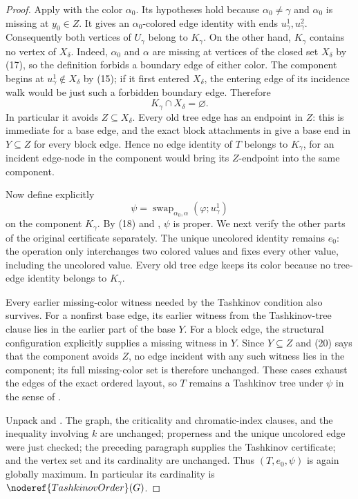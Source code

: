 \begin{proof}
Apply  with the color $\alpha_0$.
Its hypotheses hold because $\alpha_0\ne\gamma$ and $\alpha_0$ is missing
at $y_0\in Z$.  It gives an $\alpha_0$-colored edge identity with ends
$u^1_\gamma,u^2_\gamma$.  Consequently both vertices of $U_\gamma$
belong to $K_\gamma$.  On the other hand, $K_\gamma$ contains no vertex
of $X_\delta$.  Indeed, $\alpha_0$ and $\alpha$ are missing at vertices
of the closed set $X_\delta$ by (17), so the definition
 forbids a boundary edge of either color.
The component begins at $u^1_\gamma\notin X_\delta$ by (15); if it first
entered $X_\delta$, the entering edge of its incidence walk would be just
such a forbidden boundary edge.  Therefore
\[
 K_\gamma\cap X_\delta=\varnothing.                           \tag{20}
\]
In particular it avoids $Z\subseteq X_\delta$.  Every old tree edge has
an endpoint in $Z$: this is immediate for a base edge, and the exact block
attachments in  give a base end
in $Y\subseteq Z$ for every block edge.  Hence no edge identity of $T$
belongs to $K_\gamma$, for an incident edge-node in the component would
bring its $Z$-endpoint into the same component.

Now define explicitly
\[
 \psi=\operatorname{swap}_{\alpha_0,\alpha}
       (\varphi;u^1_\gamma)
\]
on the component $K_\gamma$.  By (18) and
, $\psi$ is proper.  We next verify
the other parts of the original certificate separately.  The unique
uncolored identity remains $e_0$: the operation
 only interchanges two colored values and
fixes every other value, including the uncolored value.  Every old tree
edge keeps its color because no tree-edge identity belongs to
$K_\gamma$.

Every earlier missing-color witness needed by the Tashkinov condition also
survives.  For a nonfirst base edge, its earlier witness from the
Tashkinov-tree clause lies in the earlier part of the base $Y$.  For a
block edge, the structural configuration explicitly supplies a missing
witness in $Y$.  Since $Y\subseteq Z$ and (20) says that the component
avoids $Z$, no edge incident with any such witness lies in the component;
its full missing-color set is therefore unchanged.  These cases exhaust
the edges of the exact ordered layout, so $T$ remains a Tashkinov tree
under $\psi$ in the sense of .

Unpack  and .  The graph,
the criticality and chromatic-index clauses, and the inequality involving
$k$ are unchanged; properness and the unique uncolored edge were just
checked; the preceding paragraph supplies the Tashkinov certificate; and
the vertex set and its cardinality are unchanged.  Thus
$(T,e_0,\psi)$ is again globally maximum.  In particular its cardinality
is $\noderef{TashkinovOrder}(G)$.


\end{proof}
